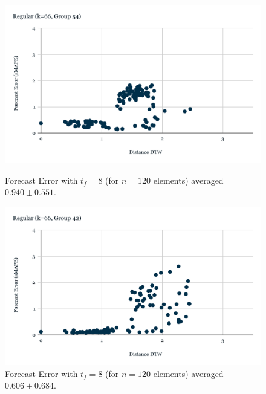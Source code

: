 \begin{figure}[!htbp]
  \centering
  \begin{minipage}[b]{0.45\textwidth}
    \includegraphics[width=\textwidth]{../Figures/distDTW_ForecastError_r66_c54}
    \caption{Forecast Error with $t_{f}=8$ (for $n=120$ elements) averaged $0.940 \pm 0.551$.}
    \label{Fig:DTWsMAPE_r66_g54}
  \end{minipage}
  \hfill
  \begin{minipage}[b]{0.45\textwidth}
    \includegraphics[width=\textwidth]{../Figures/distDTW_ForecastError_r66_c42}
    \caption{Forecast Error with $t_{f}=8$ (for $n=120$ elements) averaged $0.606 \pm 0.684$.}
    \label{Fig:DTWsMAPE_r66_g42}
  \end{minipage}


\end{figure}
